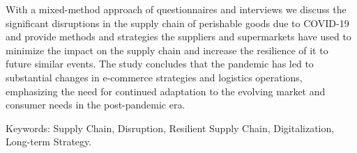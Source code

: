 With a mixed-method approach of questionnaires and interviews we discuss the significant disruptions in the supply chain of perishable goods due to COVID-19 and provide methods and strategies the suppliers and supermarkets have used to minimize the impact on the supply chain and increase the resilience of it to future similar events. The study concludes that the pandemic has led to substantial changes in e-commerce strategies and logistics operations, emphasizing the need for continued adaptation to the evolving market and consumer needs in the post-pandemic era.











\vfill
\begin{flushleft}
Keywords: Supply Chain, Disruption, Resilient Supply Chain, Digitalization, Long-term Strategy.
\end{flushleft}
\break


